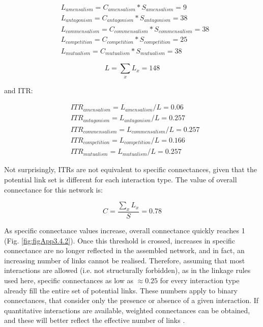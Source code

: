 \begin{align*}
& L_{amensalism} = C_{amensalism} * S_{amensalism} = 9 \\
& L_{antagonism} = C_{antagonism} * S_{antagonism} = 38 \\
& L_{commensalism} = C_{commensalism} * S_{commensalism} = 38 \\
& L_{competition} = C_{competition} * S_{competition} = 25 \\
& L_{mutualism} = C_{mutualism} * S_{mutualism} = 38
\end{align*}

\[L = \sum_x L_x = 148\]

and ITR:

\begin{align*}
& ITR_{amensalism} = L_{amensalism}/L = 0.06 \\
& ITR_{antagonism} = L_{antagonism}/L = 0.257 \\
& ITR_{commensalism} = L_{commensalism}/L = 0.257 \\
& ITR_{competition} = L_{competition}/L = 0.166 \\
& ITR_{mutualism} = L_{mutualism}/L = 0.257
\end{align*}

Not surprisingly, ITRs are not equivalent to specific connectances, given that the potential link set is different for each interaction type. The value of overall connectance for this network is:

\[C = \frac{\sum_x L_x}{S} = 0.78\]

As specific connectance values increase, overall connectance quickly reaches 1 (Fig. \ref{fig:figApp3.4.2}). Once this threshold is crossed, increases in specific connectance are no longer reflected in the assembled network, and in fact, an increasing number of links cannot be realised. Therefore, assuming that most interactions are allowed (i.e. not structurally forbidden), as in the linkage rules used here, specific connectances as low as \(\approx 0.25\) for every interaction type already fill the entire set of potential links. These numbers apply to binary connectances, that consider only the presence or absence of a given interaction. If quantitative interactions are available, weighted connectances can be obtained, and these will better reflect the effective number of links \citep{Ulanowicz2014a}.

